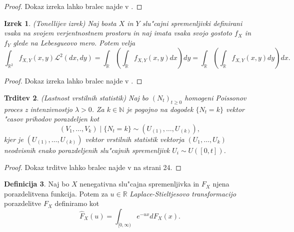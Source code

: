 \documentclass[12pt, a4paper, reqno]{amsart}
\theoremstyle{definition}
\newtheorem{definicija}{Definicija}[section]
\theoremstyle{plain}
\newtheorem{izrek}[definicija]{Izrek}
\newtheorem{trditev}[definicija]{Trditev}
\newcommand{\R}{\mathbb{R}}
\newcommand{\N}{\mathbb{N}}
\newcommand{\1}{\mathds{1}}
\begin{document}
    \begin{proof}
        Dokaz izreka lahko bralec najde v \cite{7}.
    \end{proof}

    \begin{izrek}(Tonellijev izrek)
        Naj bosta $X$ in $Y$ slu"cajni spremenljivki definirani vsaka na svojem verjentnostnem prostoru
        in naj imata vsaka svojo gostoto $f_X$ in $f_Y$ glede na Lebesgueovo mero.
        Potem velja
        \begin{equation*}
            \int_{\R^2}f_{X, Y}(x, y)\mathcal{L}^2(dx, dy) 
            = \int_{\R}\left(\int_{\R}f_{X, Y}(x, y)dx\right)dy = \int_{\R}\left(\int_{\R}f_{X, Y}(x, y)dy\right)dx.
        \end{equation*}
        \label{izr:TonellijevIzrek}
    \end{izrek}

    \begin{proof}
        Dokaz izreka lahko bralec najde v \cite{7}.
    \end{proof} 

    \begin{trditev}(Lastnost vrstilnih statistik)
        Naj bo $(N_t)_{t\geq0}$ homogeni Poissonov proces z intenzivnostjo $\lambda > 0$. 
        Za $k\in\N$ je pogojno na dogodek $\{N_t = k\}$ vektor "casov prihodov porazdeljen kot 
        \begin{equation*}
            (V_1, \dots, V_k) \mid \{N_t = k\} \sim (U_{(1)}, \dots, U_{(k)}),
        \end{equation*}
        kjer je $(U_{(1)}, \dots, U_{(k)})$ vektor vrstilnih statistik vektorja $(U_1, \dots, U_k)$ 
        neodvisnih \newline enako porazdeljenih slu"cajnih spremenljivk $U_i\sim U\left([0, t]\right)$.
        \label{trd:VrstilneStatistikeHPP}
    \end{trditev}

    \begin{proof}
        Dokaz trditve lahko bralec najde v \cite{4} na strani 24.
    \end{proof}

    \begin{definicija}
        Naj bo $X$ nenegativna slu"cajna spremenljivka in $F_X$ njena porazdelitvena funkcija. 
        Potem za $u\in\R$ \textit{Laplace-Stieltjesovo transformacijo} porazdelitve $F_X$ definiramo kot
        \begin{equation*}
            \hat{F}_X(u) = \int_{[0, \infty)}e^{-ux}dF_X(x).
        \end{equation*}
        \label{def:LaplaceStiltjesovaTransformacija}
    \end{definicija}
\end{document}
